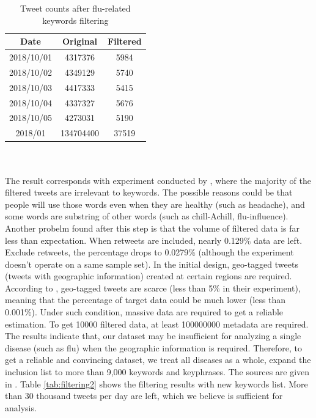 \begin{table}[!htbp]
    \centering
    \hspace{0.5cm}
    \begin{tabular}{ccc}
        Date & Original & Filtered \\ \hline
        2018/10/01 & 4317376 & 5984 \\
        2018/10/02 & 4349129 & 5740 \\
        2018/10/03 & 4417333 & 5415 \\
        2018/10/04 & 4337327 & 5676 \\
        2018/10/05 & 4273031 & 5190 \\
        2018/01 & 134704400 & 37519 \\
    \end{tabular}
    \caption{Tweet counts after flu-related keywords filtering}
    \label{tab:filtering}
\end{table}
\\\\
The result corresponds with experiment conducted by \cite{culotta2010towards}, where the majority of the filtered tweets are irrelevant to keywords. The possible reasons could be that people will use those words even when they are healthy (such as headache), and some words are substring of other words (such as chill-Achill, flu-influence). Another probelm found after this step is that the volume of filtered data is far less than expectation. When retweets are included, nearly 0.129\% data are left. Exclude retweets, the percentage drops to 0.0279\% (although the experiment doesn't operate on a same sample set). In the initial design, geo-tagged tweets (tweets with geographic information) created at certain regions are required. According to \cite{sloan}, geo-tagged tweets are scarce (less than 5\% in their experiment), meaning that the percentage of target data could be much lower (less than 0.001\%). Under such condition, massive data are required to get a reliable estimation. To get 10000 filtered data, at least 100000000 metadata are required. The results indicate that, our dataset may be insufficient for analyzing a single disease (such as flu) when the geographic information is required. Therefore, to get a reliable and convincing dataset, we treat all diseases as a whole, expand the inclusion list to more than 9,000 keywords and keyphrases. The sources are given in \cite{paul2011you}. Table \ref{tab:filtering2} shows the filtering results with new keywords list. More than 30 thousand tweets per day are left, which we believe is sufficient for analysis.
